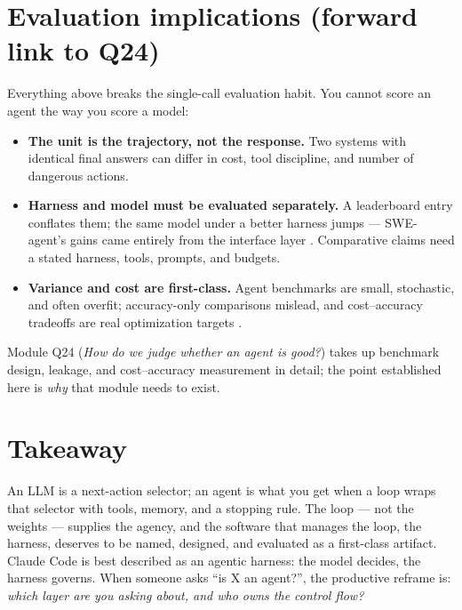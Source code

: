 \documentclass[11pt]{article}
\begin{document}
\section{Evaluation implications (forward link to Q24)}
Everything above breaks the single-call evaluation habit. You cannot score an agent the way you score a model:

\begin{itemize}[noitemsep]
  \item \textbf{The unit is the trajectory, not the response.} Two systems with identical final answers can differ in cost, tool discipline, and number of dangerous actions.
  \item \textbf{Harness and model must be evaluated separately.} A leaderboard entry conflates them; the same model under a better harness jumps --- SWE-agent's gains came entirely from the interface layer \cite{yang2024sweagent}. Comparative claims need a stated harness, tools, prompts, and budgets.
  \item \textbf{Variance and cost are first-class.} Agent benchmarks are small, stochastic, and often overfit; accuracy-only comparisons mislead, and cost--accuracy tradeoffs are real optimization targets \cite{kapoor2024agentsmatter}.
\end{itemize}

Module Q24 (\emph{How do we judge whether an agent is good?}) takes up benchmark design, leakage, and cost--accuracy measurement in detail; the point established here is \emph{why} that module needs to exist.

\section{Takeaway}
An LLM is a next-action selector; an agent is what you get when a loop wraps that selector with tools, memory, and a stopping rule. The loop --- not the weights --- supplies the agency, and the software that manages the loop, the harness, deserves to be named, designed, and evaluated as a first-class artifact. Claude Code is best described as an agentic harness: the model decides, the harness governs. When someone asks ``is X an agent?'', the productive reframe is: \emph{which layer are you asking about, and who owns the control flow?}



\end{document}
